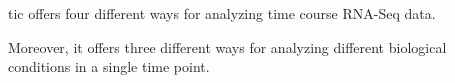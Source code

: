 \gls{tic} offers four different ways for analyzing time course RNA-Seq data.

Moreover, it offers three different ways for analyzing different biological conditions in a single time point.